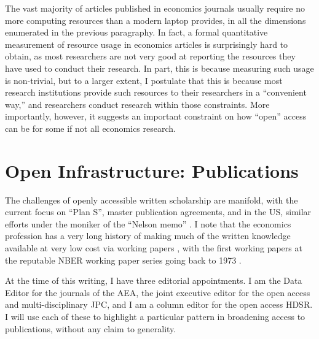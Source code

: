\documentclass{article}
\begin{document}
The vast majority of articles published in economics journals usually require no more computing resources than a modern laptop provides, in all the dimensions enumerated in the previous paragraphy. In fact, a formal quantitative measurement of resource usage in economics articles is surprisingly hard to obtain, as most researchers are not very good at reporting the resources they have used to conduct their research. In part, this is because measuring such usage is non-trivial, but to a larger extent, I postulate that this is because most research institutions provide such resources to their researchers in a ``convenient way,'' and researchers conduct research within those constraints. More importantly, however, it suggests an important constraint on how ``open'' access can be for some if not all economics research.

\section{Open Infrastructure: Publications}
\label{sec:publications}

The challenges of openly accessible written scholarship are manifold, with the current focus on ``Plan S'', master publication agreements, and in the US, similar efforts under the moniker of the ``Nelson memo'' \parencite{brainard_white_2022,brainard_us_2024}. I note that the economics profession has a very long history of making much of the written knowledge available at very low cost via working papers \parencite{vilhuber_reproducibility_2020}, with the first working papers at the reputable NBER working paper series going back to 1973 \parencite{welch_education_1973}.

At the time of this writing, I have three editorial appointments. I am the Data Editor for the journals of the \acf{AEA}, the joint executive editor for the open access and multi-disciplinary \ac{JPC}, and I am a column editor for the open access \ac{HDSR}. I will use each of these to highlight a particular pattern in broadening access to publications, without any claim to generality. 
\end{document}
